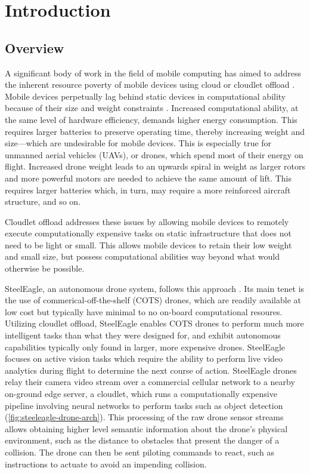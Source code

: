 \chapter{Introduction}
\section{Overview}
A significant body of work in the field of mobile computing has aimed to
address the inherent resource poverty of mobile devices using cloud or cloudlet
offload \cite{satya1996,satya2009}. Mobile devices perpetually lag behind
static devices in computational ability because of their size and weight
constraints \cite{satya2014}. Increased computational ability, at the same
level of hardware efficiency, demands higher energy consumption. This requires
larger batteries to preserve operating time, thereby increasing weight and
size---which are undesirable for mobile devices.  This is especially true for
unmanned aerial vehicles (UAVs), or drones, which spend most of their energy on
flight.  Increased drone weight leads to an upwards spiral in weight as larger
rotors and more powerful motors are needed to achieve the same amount of lift.
This requires larger batteries which, in turn, may require a more reinforced
aircraft structure, and so on.

Cloudlet offload addresses these issues by allowing mobile devices to remotely
execute computationally expensive tasks on static infrastructure that does not
need to be light or small. This allows mobile devices to retain their low
weight and small size, but possess computational abilities way beyond what
would otherwise be possible.

SteelEagle, an autonomous drone system, follows this approach \cite{bala2024}.
Its main tenet is the use of commerical-off-the-shelf (COTS) drones, which are
readily available at low cost but typically have minimal to no on-board
computational resoures.  Utilizing cloudlet offload, SteelEagle enables COTS
drones to perform much more intelligent tasks than what they were designed for,
and exhibit autonomous capabilities typically only found in larger, more
expensive drones.  SteelEagle focuses on active vision tasks which require the
ability to perform live video analytics during flight to determine the next
course of action. SteelEagle drones relay their camera video stream over a
commercial cellular network to a nearby on-ground edge server, a cloudlet,
which runs a computationally expensive pipeline involving neural networks to
perform tasks such as object detection (\cref{fig:steeleagle-drone-arch}).  This processing of the raw drone
sensor streams allows obtaining higher level semantic information about the
drone's physical environment, such as the distance to obstacles that present
the danger of a collision. The drone can then be sent piloting commands to
react, such as instructions to actuate to avoid an impending collision.

